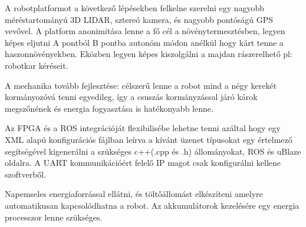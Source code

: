 A robotplatformot a következő lépésekben felkelne szerelni egy nagyobb méréstartományú 3D LIDAR, sztereó kamera, és nagyobb pontóságú GPS vevővel.
A platform  anonimitása lenne a fő cél a növénytermesztésben, legyen képes eljutni A pontból B pontba autonóm módon anélkül hogy kárt tenne a haszonnövényekben. Eközben legyen képes kiszolgálni a majdan rászerelhető pl: robotkar kéréseit.

A mechanika tovább fejlesztése: célszerű lenne a robot mind a négy kerekét kormányozóvá tenni egyedileg, így a csuszás kormányzással járó károk megszőnének és energia fogyasztása is hatékonyabb lenne.

Az FPGA és a ROS integrációját flexibilisébe lehetne tenni azáltal hogy egy XML alapú konfigurációs fájlban leírva a kívánt üzenet típusokat egy értelmező segítségével kigenerálni a szükséges c++(.cpp és .h) állományokat, ROS és uBlaze oldalra. A UART kommunikációért felelő IP magot csak konfigurálni kellene szoftverből.


Napemseles energiaforrással ellátni, és töltőállomást elkészíteni amelyre automatikusan kapcsolódhatna a robot. Az akkumulátorok kezelésére egy energia processzor lenne szükséges.
